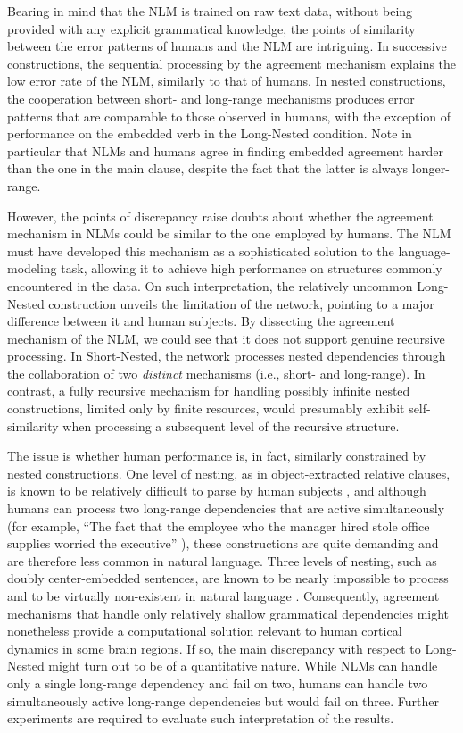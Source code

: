 Bearing in mind that the NLM is trained on raw text data, without being provided with any explicit grammatical knowledge, the points of similarity between the error patterns of humans and the NLM are intriguing. In successive constructions, the sequential processing by the agreement mechanism explains the low error rate of the NLM, similarly to that of humans. In nested constructions, the cooperation between short- and long-range mechanisms produces error patterns that are comparable to those observed in humans, with the exception of performance on the embedded verb in the Long-Nested condition. Note in particular that NLMs and humans agree in finding embedded agreement harder than the one in the main clause, despite the fact that the latter is always longer-range.

However, the points of discrepancy raise doubts about whether the agreement mechanism in NLMs could be similar to the one employed by humans. The NLM must have developed this mechanism as a sophisticated solution to the language-modeling task, allowing it to achieve high performance on structures commonly encountered in the data. On such interpretation, the relatively uncommon Long-Nested construction unveils the limitation of the network, pointing to a major difference between it and human subjects. By dissecting the agreement mechanism of the NLM, we could see that it does not support genuine recursive processing. In Short-Nested, the network processes nested dependencies through the collaboration of two \textit{distinct} mechanisms (i.e., short- and long-range). In contrast, a fully recursive mechanism for handling possibly infinite nested constructions, limited only by finite resources, would presumably exhibit self-similarity when processing a subsequent level of the recursive structure. 

The issue is whether human performance is, in fact, similarly constrained by nested constructions. One level of nesting, as in object-extracted relative clauses, is known to be relatively difficult to parse by human subjects \citep[e.g.,][]{traxler2002processing}, and although humans can process two long-range dependencies that are active simultaneously (for example, ``The fact that the employee who the manager hired stole office supplies worried the executive'' \citep{Gibson:1998}), these constructions are quite demanding and are therefore less common in natural language. Three levels of nesting, such as doubly center-embedded sentences, are known to be nearly impossible to process and to be virtually non-existent in natural language \citep{karlsson2007constraints}. Consequently, agreement mechanisms that handle only relatively shallow grammatical dependencies might nonetheless provide a computational solution relevant to human cortical dynamics in some brain regions. If so, the main discrepancy with respect to Long-Nested might turn out to be of a quantitative nature. While NLMs can handle only a single long-range dependency and fail on two, humans can handle two simultaneously active long-range dependencies but would fail on three. Further experiments are required to evaluate such interpretation of the results.


